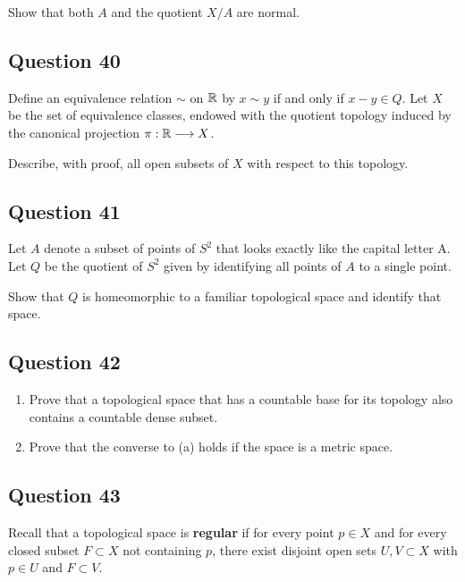 \documentclass[12pt]{article}
\begin{document}
Show that both \(A\) and the quotient \(X/A\) are normal.

\hypertarget{question-40-3}{%
\subsection{Question 40}\label{question-40-3}}

Define an equivalence relation \(\sim\) on \({\mathbb{R}}\) by \(x \sim y\) if
and only if \(x - y \in Q\). Let \(X\) be the set of equivalence
classes, endowed with the quotient topology induced by the canonical
projection \(\pi : {\mathbb{R}} \longrightarrow X\).

Describe, with proof, all open subsets of \(X\) with respect to this
topology.

\hypertarget{question-41-3}{%
\subsection{Question 41}\label{question-41-3}}

Let \(A\) denote a subset of points of \(S^2\) that looks exactly like
the capital letter A. Let \(Q\) be the quotient of \(S^2\) given by
identifying all points of \(A\) to a single point.

Show that \(Q\) is homeomorphic to a familiar topological space and
identify that space.

\hypertarget{question-42-3}{%
\subsection{Question 42}\label{question-42-3}}

\begin{enumerate}
\def\labelenumi{\alph{enumi}.}
\item
  Prove that a topological space that has a countable base for its
  topology also contains a countable dense subset.
\item
  Prove that the converse to (a) holds if the space is a metric space.
\end{enumerate}

\hypertarget{question-43-3}{%
\subsection{Question 43}\label{question-43-3}}

Recall that a topological space is \textbf{regular} if for every point
\(p \in X\) and for every closed subset \(F \subset X\) not containing
\(p\), there exist disjoint open sets \(U, V \subset X\) with
\(p \in U\) and \(F \subset V\).
\end{document}
